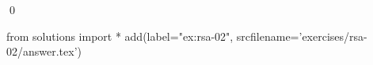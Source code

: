 
\begin{ex} 
  \label{ex:rsa-02}
  
  \qed
\end{ex} 
\begin{python0}
from solutions import *
add(label="ex:rsa-02",
    srcfilename='exercises/rsa-02/answer.tex') 
\end{python0}
